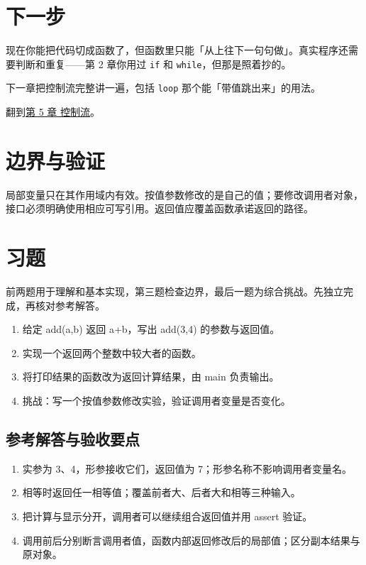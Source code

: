 \section{下一步}

现在你能把代码切成函数了，但函数里只能「从上往下一句句做」。真实程序还需要判断和重复——第 2 章你用过 \texttt{if} 和 \texttt{while}，但那是照着抄的。

下一章把控制流完整讲一遍，包括 \texttt{loop} 那个能「带值跳出来」的用法。

翻到\hyperref[ch:05]{第 5 章 控制流}。

\section{边界与验证}

局部变量只在其作用域内有效。按值参数修改的是自己的值；要修改调用者对象，接口必须明确使用相应可写引用。返回值应覆盖函数承诺返回的路径。

\section{习题}

前两题用于理解和基本实现，第三题检查边界，最后一题为综合挑战。先独立完成，再核对参考解答。

\begin{enumerate}

\item 给定 add(a,b) 返回 a+b，写出 add(3,4) 的参数与返回值。

\item 实现一个返回两个整数中较大者的函数。

\item 将打印结果的函数改为返回计算结果，由 main 负责输出。

\item 挑战：写一个按值参数修改实验，验证调用者变量是否变化。

\end{enumerate}

\subsection*{参考解答与验收要点}

\begin{enumerate}

\item 实参为 3、4，形参接收它们，返回值为 7；形参名称不影响调用者变量名。

\item 相等时返回任一相等值；覆盖前者大、后者大和相等三种输入。

\item 把计算与显示分开，调用者可以继续组合返回值并用 assert 验证。

\item 调用前后分别断言调用者值，函数内部返回修改后的局部值；区分副本结果与原对象。

\end{enumerate}

